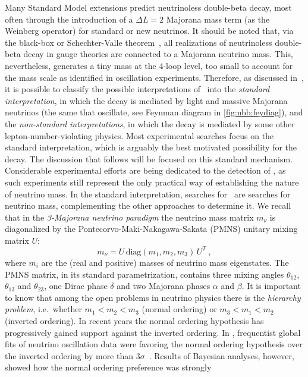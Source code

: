 \newpar
Many Standard Model extensions predict neutrinoless double-beta decay, most often through
the introduction of a $\Delta L = 2$ Majorana mass term (as the Weinberg operator) for
standard or new neutrinos.  It should be noted that, via the black-box or Schechter-Valle
theorem~\cite{Schechter1982}, all realizations of neutrinoless double-beta decay in gauge
theories are connected to a Majorana neutrino mass. This, nevertheless, generates a tiny
mass at the 4-loop level, too small to account for the mass scale as identified in
oscillation experiments.  Therefore, as discussed in~\cite{Rodejohann2011}, it is possible
to classify the possible interpretations of \onbb\ into the \emph{standard interpretation}, in
which the decay is mediated by light and massive Majorana neutrinos (the same that
oscillate, see Feynman diagram in \cref{fig:nbb:feydiag}), and the \emph{non-standard
interpretations}, in which the decay is mediated by some other lepton-number-violating
physics. Most experimental searches focus on the standard interpretation, which is
arguably the best motivated possibility for the decay. The discussion that follows will be
focused on this standard mechanism. Considerable experimental efforts are being dedicated
to the detection of \onbb, as such experiments still represent the only practical way of
establishing the nature of neutrino mass.
\newpar
In the standard interpretation, searches for \onbb\ are searches for neutrino mass,
complementing the other approaches to determine it. We recall that in the \emph{3-Majorana
neutrino paradigm} the neutrino mass matrix $m_\nu$ is diagonalized by the
Pontecorvo-Maki-Nakagawa-Sakata (PMNS) unitary mixing matrix $U$:
\[
  m_\nu = U \, \text{diag}(m_1, m_2, m_3) \, U^T \;,
\]
where $m_i$ are the (real and positive) masses of neutrino mass eigenstates.  The PMNS
matrix, in its standard parametrization, contains three mixing angles $\theta_{12}$,
$\theta_{13}$ and $\theta_{23}$, one Dirac phase $\delta$ and two Majorana phases
$\alpha$ and $\beta$. It is important to know that among the open problems in neutrino
physics there is the \emph{hierarchy problem}, i.e.~whether $m_1 < m_2 < m_3$ (normal ordering)
or $m_3 < m_1 < m_2$ (inverted ordering).  In recent years the normal ordering
hypothesis has progressively gained support against the inverted ordering. In ,
frequentist global fits of neutrino oscillation data were favoring the normal ordering
hypothesis over the inverted ordering by more than $3\sigma$~\cite{Esteban2019}. Results
of Bayesian analyses, however, showed how the normal ordering preference was strongly
